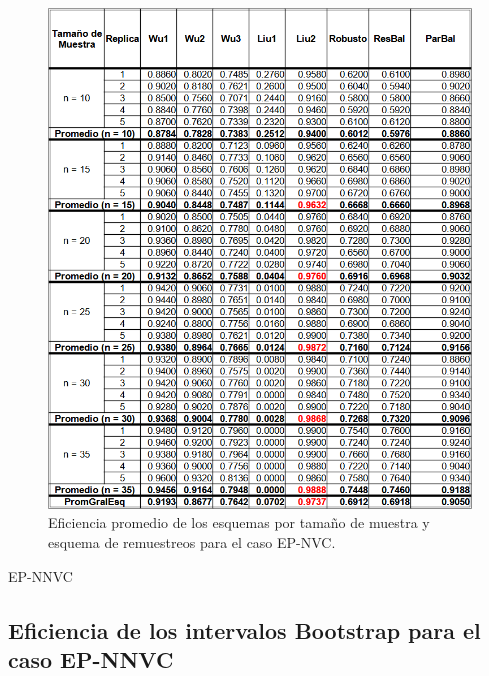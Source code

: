 \begin{figure}[ht] 
	\centering 
	\includegraphics[width=0.9\linewidth]{img/EP_NVC_Efic_Esq.png} 
	\caption{Eficiencia promedio de los esquemas por tamaño de muestra y esquema de remuestreos para el caso EP-NVC.} 
	\label{fig:EP_NVC_Esq}
\end{figure}

EP-NNVC
\subsection{Eficiencia de los intervalos Bootstrap para el caso EP-NNVC}

